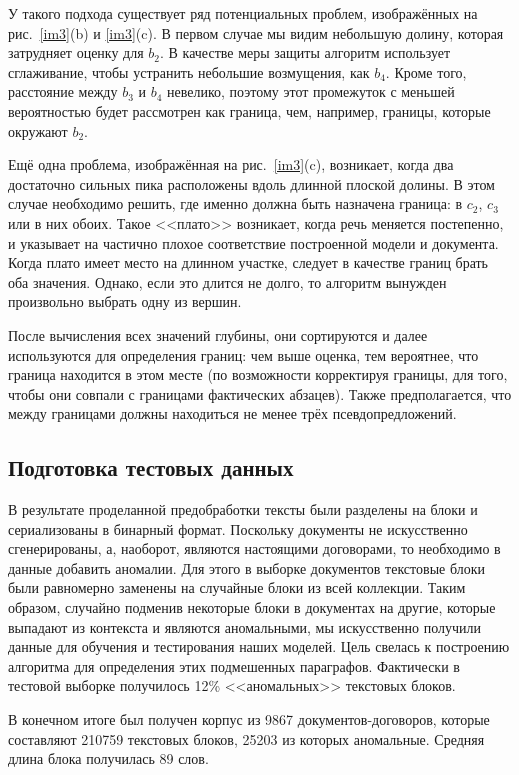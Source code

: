 \documentclass[14pt]{matmex-diploma-custom}
\begin{document}
У такого подхода существует ряд потенциальных проблем, изображённых на рис.~\ref{im3}(b) и \ref{im3}(c). В первом случае мы видим небольшую долину, которая затрудняет оценку для $b_2$. В качестве меры защиты алгоритм использует сглаживание, чтобы устранить небольшие возмущения, как $b_4$. Кроме того, расстояние между $b_3$ и $b_4$ невелико, поэтому этот промежуток с меньшей вероятностью будет рассмотрен как граница, чем, например, границы, которые окружают $b_2$. 

Ещё одна проблема, изображённая на рис.~\ref{im3}(c), возникает, когда два достаточно сильных пика расположены вдоль длинной плоской долины. В этом случае необходимо решить, где именно должна быть назначена граница: в $c_2$, $c_3$ или в них обоих. Такое <<плато>> возникает, когда речь меняется постепенно, и указывает на частично плохое соответствие построенной модели и документа. Когда плато имеет место на длинном участке, следует в качестве границ брать оба значения. Однако, если это длится не долго, то алгоритм вынужден произвольно выбрать одну из вершин. 

После вычисления всех значений глубины, они сортируются и далее используются для определения границ: чем выше оценка, тем вероятнее, что граница находится в этом месте (по возможности корректируя границы, для того, чтобы они совпали с границами фактических абзацев). Также предполагается, что между границами должны находиться не менее трёх псевдопредложений.

\subsection{Подготовка тестовых данных}
В результате проделанной предобработки тексты были разделены на блоки и сериализованы в бинарный формат. Поскольку документы не искусственно сгенерированы, а, наоборот, являются настоящими договорами, то необходимо в данные добавить аномалии. Для этого в выборке документов текстовые блоки были равномерно заменены на случайные блоки из всей коллекции. Таким образом, случайно подменив некоторые блоки в документах на другие, которые выпадают из контекста и являются аномальными, мы искусственно получили данные для обучения и тестирования наших моделей. Цель свелась к построению алгоритма для определения этих подмешенных параграфов. Фактически в тестовой выборке получилось  12\% <<аномальных>> текстовых блоков.

В конечном итоге был получен корпус из 9867 документов-\linebreak договоров, которые составляют 210759 текстовых блоков, 25203 из которых аномальные. Средняя длина блока получилась 89 слов.
\end{document}
